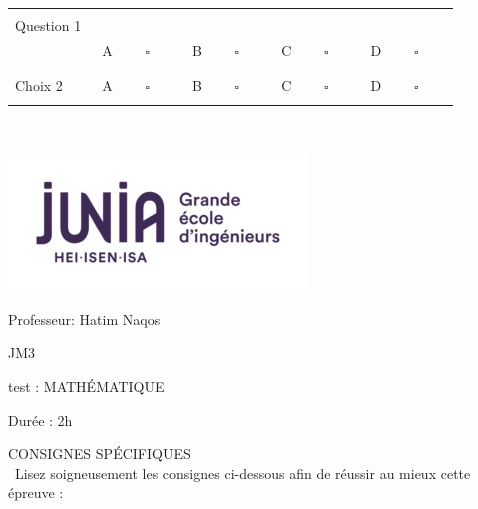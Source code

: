 \documentclass{book}%
\begin{document}
\begin{center}%
\begin{tabular}{| l l l l l |}%
\hline%
 & & & & \\%
Question 1\qquad \qquad\ & & & & \\%
 & A $\qquad \square \qquad$ & B $\qquad \square \qquad$ & C $\qquad \square \qquad$ & D $\qquad \square \qquad$ \\ %
 & & & &  \\%
\hline%
 & & & &  \\%
Choix 2 & A $\qquad \square \qquad$ & B $\qquad \square \qquad$ & C $\qquad \square \qquad$ & D $\qquad \square \qquad$ \\ %
 & & & &  \\%
\hline%
\end{tabular}%
\\ \vskip3mm%
\thispagestyle{empty}%
\end{center}%
\newpage%
\thispagestyle{empty}%
\vskip-40mm	\includegraphics[scale=0.5]{logo.png} \\%
 \begin{flushright}  \vskip-20mm   Professeur: Hatim Naqos\vskip15mm  \end{flushright}%
JM3%
\begin{center}   \begin{Large}test : MATHÉMATIQUE\end{Large} \end{center}%
Durée : 2h%
 \begin{center} { \large CONSIGNES SPÉCIFIQUES } \\\ Lisez soigneusement les consignes ci-dessous afin de réussir au mieux cette épreuve : \end{center} %
\end{document}
